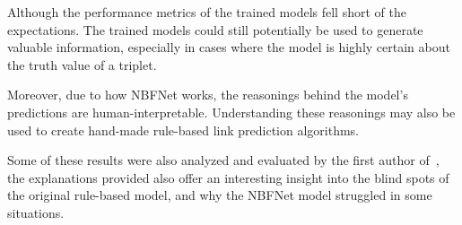 Although the performance metrics of the trained models fell short of the expectations.
The trained models could still potentially be used to generate valuable information,
especially in cases where the model is highly certain about the truth value of a triplet.

Moreover, due to how NBFNet works, the reasonings behind the model's predictions are human-interpretable.
Understanding these reasonings may also be used to create hand-made rule-based link prediction algorithms.

Some of these results were also analyzed and evaluated by the first author of~\cite{YaqutRB}, the
explanations provided also offer an interesting insight into the blind spots of the original rule-based model,
and why the NBFNet model struggled in some situations. 